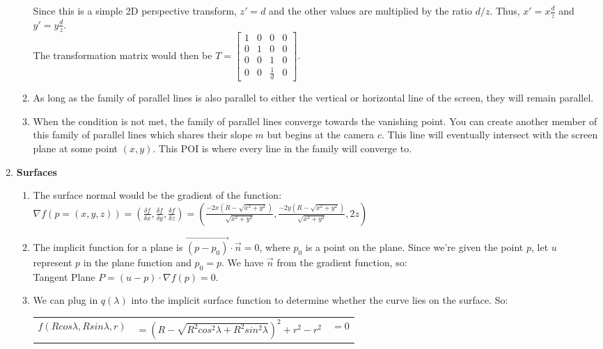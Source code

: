\documentclass[12pt]{article}
\begin{document}
\begin{enumerate}
\begin{enumerate}
Since this is a simple 2D perspective transform, $z' = d$ and the other values are multiplied by the ratio $d/z$. Thus, $x' = x\frac{d}{z}$ and $y' = y\frac{d}{z}$.\\
The transformation matrix would then be $T = \begin{bmatrix}
1 & 0 & 0 & 0\\
0 & 1 & 0 & 0\\
0 & 0 & 1 & 0\\
0 & 0 & \frac{1}{d} & 0
\end{bmatrix}$.
\item %
As long as the family of parallel lines is also parallel to either the vertical or horizontal line of the screen, they will remain parallel. 
\item %
When the condition is not met, the family of parallel lines converge towards the vanishing point. You can create another member of this family of parallel lines which shares their slope $m$ but begins at the camera $c$. This line will eventually intersect with the screen plane at some point $(x,y)$. This POI is where every line in the family will converge to.
\end{enumerate}
\item \textbf{Surfaces}
\begin{enumerate}
\item %
The surface normal would be the gradient of the function:\\
$\nabla f(p = (x,y,z)) = (\frac{\delta f}{\delta x},\frac{\delta f}{\delta y},\frac{\delta f}{\delta z}) = (\frac{-2x(R-\sqrt{x^2 + y^2})}{\sqrt{x^2 + y^2}}, \frac{-2y(R-\sqrt{x^2 + y^2})}{\sqrt{x^2 + y^2}}, 2z)$
\item %
The implicit function for a plane is $\vec{(p-p_0)}\cdot \vec{n} = 0$, where $p_0$ is a point on the plane. Since we're given the point $p$, let $u$ represent $p$ in the plane function and $p_0 = p$. We have $\vec{n}$ from the gradient function, so:\\
Tangent Plane $P = (u-p)\cdot \nabla f(p) = 0$.
\item %
We can plug in $q(\lambda)$ into the implicit surface function to determine whether the curve lies on the surface. So:\\\begin{tabular}{l l l}
$f(Rcos\lambda,Rsin\lambda, r)$ & $= (R-\sqrt{R^2cos^2\lambda + R^2sin^2\lambda})^2 + r^2 - r^2$ & $= 0$\\

\end{tabular}
\end{enumerate}
\end{enumerate}
\end{document}
